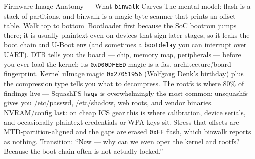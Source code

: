 \documentclass[aspectratio=169,11pt]{beamer}
\begin{document}
\begin{frame}{Firmware Image Anatomy --- What \texttt{binwalk} Carves}
{  The mental model: flash is a stack of partitions, and binwalk is a magic-byte scanner that prints an offset table. Walk top to bottom. Bootloader first because the SoC bootrom jumps there; it is usually plaintext even on devices that sign later stages, so it leaks the boot chain and U-Boot env (and sometimes a \texttt{bootdelay} you can interrupt over UART). DTB tells you the board --- chip, memory map, peripherals --- before you ever load the kernel; its \texttt{0xD00DFEED} magic is a fast architecture/board fingerprint. Kernel uImage magic \texttt{0x27051956} (Wolfgang Denk's birthday) plus the compression type tells you what to decompress. The rootfs is where 80\% of findings live --- SquashFS \texttt{hsqs} is overwhelmingly the most common; unsquashfs gives you /etc/passwd, /etc/shadow, web roots, and vendor binaries. NVRAM/config last: on cheap ICS gear this is where calibration, device serials, and occasionally plaintext credentials or WPA keys sit. Stress that offsets are MTD-partition-aligned and the gaps are erased \texttt{0xFF} flash, which binwalk reports as nothing. Transition: ``Now --- why can we even open the kernel and rootfs? Because the boot chain often is not actually locked.''
}
\end{frame}
\end{document}
